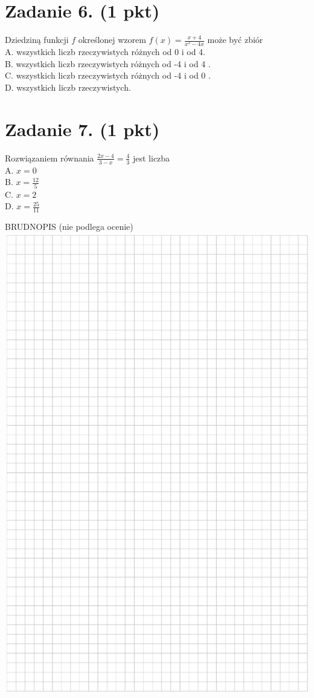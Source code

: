 \documentclass[10pt]{article}
\begin{document}
\section*{Zadanie 6. (1 pkt)}
Dziedziną funkcji \(f\) określonej wzorem \(f(x)=\frac{x+4}{x^{2}-4 x}\) może być zbiór\\
A. wszystkich liczb rzeczywistych różnych od 0 i od 4.\\
B. wszystkich liczb rzeczywistych różnych od -4 i od 4 .\\
C. wszystkich liczb rzeczywistych różnych od -4 i od 0 .\\
D. wszystkich liczb rzeczywistych.

\section*{Zadanie 7. (1 pkt)}
Rozwiązaniem równania \(\frac{2 x-4}{3-x}=\frac{4}{3}\) jest liczba\\
A. \(x=0\)\\
B. \(x=\frac{12}{5}\)\\
C. \(x=2\)\\
D. \(x=\frac{25}{11}\)

BRUDNOPIS (nie podlega ocenie)\\
\includegraphics[max width=\textwidth, center]{2024_11_21_e19607c15353cb4d7e48g-03}
\end{document}
